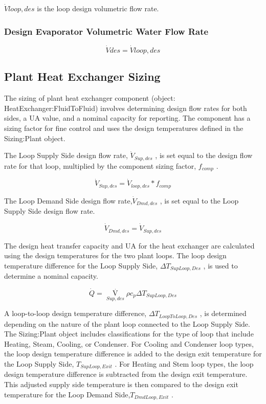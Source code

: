\(\dot Vloop,des\) is the loop design volumetric flow rate.

\subsubsection{Design Evaporator Volumetric Water Flow Rate}\label{design-evaporator-volumetric-water-flow-rate-1}

\begin{equation}
\dot Vdes = \dot Vloop,des
\end{equation}

\subsection{Plant Heat Exchanger Sizing}\label{plant-heat-exchanger-sizing}

The sizing of plant heat exchanger component (object: HeatExchanger:FluidToFluid) involves determining design flow rates for both sides, a UA value, and a nominal capacity for reporting. The component has a sizing factor for fine control and uses the design temperatures defined in the Sizing:Plant object.

The Loop Supply Side design flow rate, \({\dot V_{Sup,des}}\) , is set equal to the design flow rate for that loop, multiplied by the component sizing factor, \({f_{comp}}\) .

\begin{equation}
{\dot V_{Sup,des}} = {\dot V_{loop,des}}*{f_{comp}}
\end{equation}

The Loop Demand Side design flow rate,\({\dot V_{Dmd,des}}\) , is set equal to the Loop Supply Side design flow rate.

\begin{equation}
{\dot V_{Dmd,des}} = {\dot V_{Sup,des}}
\end{equation}

The design heat transfer capacity and UA for the heat exchanger are calculated using the design temperatures for the two plant loops. The loop design temperature difference for the Loop Supply Side, \(\Delta {T_{SupLoop,Des}}\) , is used to determine a nominal capacity.

\begin{equation}
\dot Q = {\mathop V\limits^._{Sup,des}}\rho {c_p}\Delta {T_{SupLoop,Des}}
\end{equation}

A loop-to-loop design temperature difference, \(\Delta {T_{LoopToLoop,Des}}\) , is determined depending on the nature of the plant loop connected to the Loop Supply Side. The Sizing:Plant object includes classifications for the type of loop that include Heating, Steam, Cooling, or Condenser. For Cooling and Condenser loop types, the loop design temperature difference is added to the design exit temperature for the Loop Supply Side, \({T_{SupLoop,Exit}}\) . For Heating and Stem loop types, the loop design temperature difference is subtracted from the design exit temperature. This adjusted supply side temperature is then compared to the design exit temperature for the Loop Demand Side,\({T_{DmdLoop,Exit}}\) .

